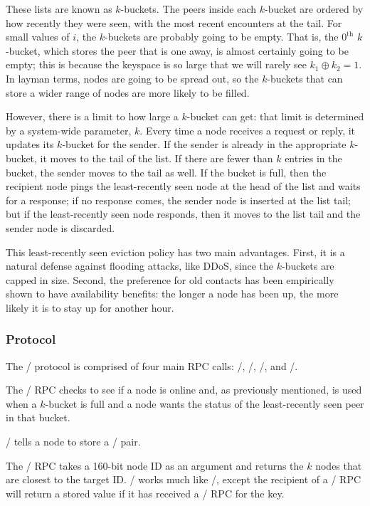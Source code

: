 \documentclass[11pt,twocolumn]{article}
\begin{document}
These lists are known as $k$-buckets.
The peers inside each $k$-bucket are ordered by how recently they were seen, with the most recent encounters at the tail.
For small values of $i$, the $k$-buckets are probably going to be empty.
That is, the $0^{\mathrm{th}}$ $k$-bucket, which stores the peer that is one away, is almost certainly going to be empty; this is because the keyspace is so large that we will rarely see $k_1 \oplus k_2 = 1$.
In layman terms, nodes are going to be spread out, so the $k$-buckets that can store a wider range of nodes are more likely to be filled.

However, there is a limit to how large a $k$-bucket can get: that limit is determined by a system-wide parameter, $k$.
Every time a node receives a request or reply, it updates its $k$-bucket for the sender.
If the sender is already in the appropriate $k$-bucket, it moves to the tail of the list.
If there are fewer than $k$ entries in the bucket, the sender moves to the tail as well.
If the bucket is full, then the recipient node pings the least-recently seen node at the head of the list and waits for a response; if no response comes, the sender node is inserted at the list tail; but if the least-recently seen node responds, then it moves to the list tail and the sender node is discarded.

This least-recently seen eviction policy has two main advantages.
First, it is a natural defense against flooding attacks, like DDoS, since the $k$-buckets are capped in size.
Second, the preference for old contacts has been empirically shown to have availability benefits: the longer a node has been up, the more likely it is to stay up for another hour.

\subsubsection{Protocol}

The \Kademlia/ protocol is comprised of four main RPC calls: \ping/, \store/, \findNode/, and \findValue/.

The \ping/ RPC checks to see if a node is online and, as previously mentioned, is used when a $k$-bucket is full and a node wants the status of the least-recently seen peer in that bucket.

\store/ tells a node to store a \kv/ pair.

The \findNode/ RPC takes a 160-bit node ID as an argument and returns the $k$ nodes that are closest to the target ID.
\findValue/ works much like \findNode/, except the recipient of a \findValue/ RPC will return a stored value if it has received a \store/ RPC for the key.
\end{document}
